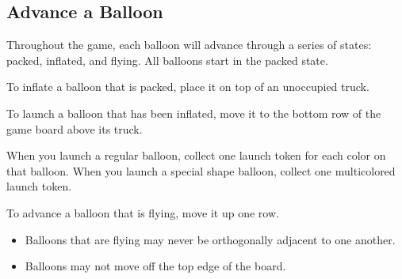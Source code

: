 \documentclass[a6paper, 11pt, parskip=half, DIV=15]{scrartcl}
\begin{document}
\subsection*{Advance a Balloon}
Throughout the game, each balloon will advance through a series of states: packed, inflated, and flying. All balloons start in the packed state.


\begin{description}[leftmargin=0pt]
  \item[Inflate:] To inflate a balloon that is packed, place it on top of an unoccupied truck.
  \item[Launch:] To launch a balloon that has been inflated, move it to the bottom row of the game board above its truck. 
  
  When you launch a regular balloon, collect one launch token for each color on that balloon. When you launch a special shape balloon, collect one multicolored launch token.
  \item[Ascend:] To advance a balloon that is flying, move it up one row. 
  \begin{itemize}
    \item Balloons that are flying may never be orthogonally adjacent to one another.%
    \item Balloons may not move off the top edge of the board.
  \end{itemize}
\end{description}

\newpage
\enlargethispage{1.75\baselineskip}
%
%
%
%
\end{document}
